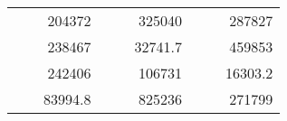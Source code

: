 \begin{table}[H]
\begin{tabular}{|ccrccrccc}
\rowcolor[HTML]{DAE8FC} 
\multicolumn{1}{|c|}{\cellcolor[HTML]{FFFFC7}}                                & \multicolumn{1}{c|}{\cellcolor[HTML]{DAE8FC}}                      & \multicolumn{1}{r|}{\cellcolor[HTML]{DAE8FC}204372}    & \multicolumn{1}{c|}{\cellcolor[HTML]{FFFFC7}}                                & \multicolumn{1}{c|}{\cellcolor[HTML]{DAE8FC}}                       & \multicolumn{1}{r|}{\cellcolor[HTML]{DAE8FC}325040}    & \multicolumn{1}{c|}{\cellcolor[HTML]{FFFFC7}}                                & \multicolumn{1}{c|}{\cellcolor[HTML]{DAE8FC}}                      & \multicolumn{1}{r|}{\cellcolor[HTML]{DAE8FC}287827}    \\ \cline{3-3} \cline{6-6} \cline{9-9} 
\multicolumn{1}{|c|}{\cellcolor[HTML]{FFFFC7}}                                & \multicolumn{1}{c|}{\cellcolor[HTML]{DAE8FC}}                      & \multicolumn{1}{r|}{\cellcolor[HTML]{DDFDFF}238467}    & \multicolumn{1}{c|}{\cellcolor[HTML]{FFFFC7}}                                & \multicolumn{1}{c|}{\cellcolor[HTML]{DAE8FC}}                       & \multicolumn{1}{r|}{\cellcolor[HTML]{DDFDFF}32741.7}   & \multicolumn{1}{c|}{\cellcolor[HTML]{FFFFC7}}                                & \multicolumn{1}{c|}{\cellcolor[HTML]{DAE8FC}}                      & \multicolumn{1}{r|}{\cellcolor[HTML]{DDFDFF}459853}    \\ \cline{3-3} \cline{6-6} \cline{9-9} 
\rowcolor[HTML]{DAE8FC} 
\multicolumn{1}{|c|}{\cellcolor[HTML]{FFFFC7}}                                & \multicolumn{1}{c|}{\cellcolor[HTML]{DAE8FC}}                      & \multicolumn{1}{r|}{\cellcolor[HTML]{DAE8FC}242406}    & \multicolumn{1}{c|}{\cellcolor[HTML]{FFFFC7}}                                & \multicolumn{1}{c|}{\cellcolor[HTML]{DAE8FC}}                       & \multicolumn{1}{r|}{\cellcolor[HTML]{DAE8FC}106731}    & \multicolumn{1}{c|}{\cellcolor[HTML]{FFFFC7}}                                & \multicolumn{1}{c|}{\cellcolor[HTML]{DAE8FC}}                      & \multicolumn{1}{r|}{\cellcolor[HTML]{DAE8FC}16303.2}   \\ \cline{3-3} \cline{6-6} \cline{9-9} 
\multicolumn{1}{|c|}{\cellcolor[HTML]{FFFFC7}}                                & \multicolumn{1}{c|}{\cellcolor[HTML]{DAE8FC}}                      & \multicolumn{1}{r|}{\cellcolor[HTML]{DDFDFF}83994.8}   & \multicolumn{1}{c|}{\cellcolor[HTML]{FFFFC7}}                                & \multicolumn{1}{c|}{\cellcolor[HTML]{DAE8FC}}                       & \multicolumn{1}{r|}{\cellcolor[HTML]{DDFDFF}825236}    & \multicolumn{1}{c|}{\cellcolor[HTML]{FFFFC7}}                                & \multicolumn{1}{c|}{\cellcolor[HTML]{DAE8FC}}                      & \multicolumn{1}{r|}{\cellcolor[HTML]{DDFDFF}271799}    \\ \cline{3-3} \cline{6-6} \cline{9-9} 

\end{tabular}
\end{table}
